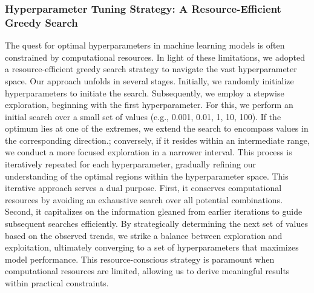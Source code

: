 

\subsubsection{Hyperparameter Tuning Strategy: A Resource-Efficient Greedy Search}

The quest for optimal hyperparameters in machine learning models is often constrained by computational resources. In light of these 
limitations, we adopted a resource-efficient greedy search strategy to navigate the vast hyperparameter space.
Our approach unfolds in several stages. Initially, we randomly initialize hyperparameters to initiate the search. Subsequently, we employ 
a stepwise exploration, beginning with the first hyperparameter. For this, we perform an initial search over a small set of values 
(e.g., 0.001, 0.01, 1, 10, 100). If the optimum lies at one of the extremes, we extend the search to encompass values in the corresponding 
direction.; conversely, if it resides within an intermediate range, we conduct a more focused exploration in a narrower interval. 
This process is iteratively repeated for each hyperparameter, gradually refining our understanding of the optimal regions within the 
hyperparameter space.
This iterative approach serves a dual purpose. First, it conserves computational resources by avoiding an exhaustive search over all 
potential combinations. Second, it capitalizes on the information gleaned from earlier iterations to guide subsequent searches efficiently. 
By strategically determining the next set of values based on the observed trends, we strike a balance between exploration and exploitation, 
ultimately converging to a set of hyperparameters that maximizes model performance. This resource-conscious strategy is paramount when 
computational resources are limited, allowing us to derive meaningful results within practical constraints.

